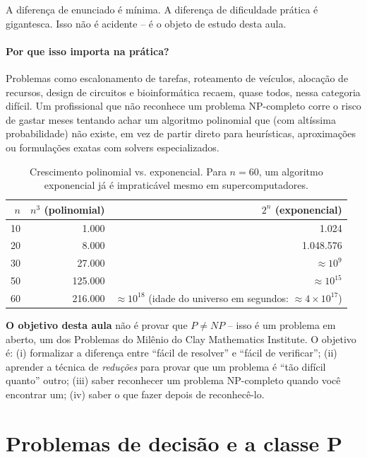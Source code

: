 \documentclass[9pt,a4paper]{extarticle}
\newcommand{\impt}[1]{\textcolor{important}{\textbf{#1}}}
\theoremstyle{definition}
\begin{document}
A diferença de enunciado é mínima. A diferença de dificuldade prática é gigantesca. Isso não é acidente -- é o objeto de estudo desta aula.

\paragraph{Por que isso importa na prática?} Problemas como escalonamento de tarefas, roteamento de veículos, alocação de recursos, design de circuitos e bioinformática recaem, quase todos, nessa categoria difícil. Um profissional que não reconhece um problema NP-completo corre o risco de gastar meses tentando achar um algoritmo polinomial que (com altíssima probabilidade) não existe, em vez de partir direto para heurísticas, aproximações ou formulações exatas com solvers especializados.

\begin{table}[h]
\centering
\begin{tabular}{@{}rrr@{}}
\toprule
\(n\) & \(n^3\) (polinomial) & \(2^n\) (exponencial) \\
\midrule
10 & 1.000 & 1.024 \\
20 & 8.000 & 1.048.576 \\
30 & 27.000 & \(\approx 10^9\) \\
50 & 125.000 & \(\approx 10^{15}\) \\
60 & 216.000 & \(\approx 10^{18}\) (idade do universo em segundos: \(\approx 4\times10^{17}\)) \\
\bottomrule
\end{tabular}
\caption{Crescimento polinomial vs. exponencial. Para \(n=60\), um algoritmo exponencial já é impraticável mesmo em supercomputadores.}
\end{table}

\impt{O objetivo desta aula} não é provar que \(P \neq NP\) -- isso é um problema em aberto, um dos Problemas do Milênio do Clay Mathematics Institute. O objetivo é: (i) formalizar a diferença entre \enquote{fácil de resolver} e \enquote{fácil de verificar}; (ii) aprender a técnica de \emph{reduções} para provar que um problema é \enquote{tão difícil quanto} outro; (iii) saber reconhecer um problema NP-completo quando você encontrar um; (iv) saber o que fazer depois de reconhecê-lo.

\section{Problemas de decisão e a classe P}\label{sec:classe-p}
\end{document}
